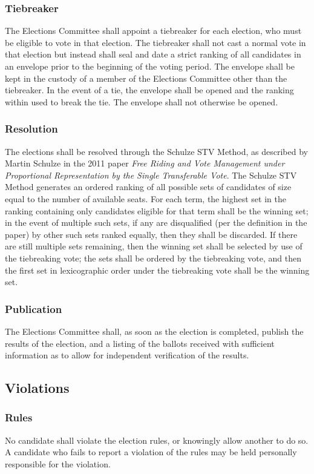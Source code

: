 \subsubsection{Tiebreaker}
The Elections Committee shall appoint a tiebreaker for each election, who must
be eligible to vote in that election. The tiebreaker shall not cast a normal
vote in that election but instead shall seal and date a strict ranking of all
candidates in an envelope prior to the beginning of the voting period. The
envelope shall be kept in the custody of a member of the Elections Committee
other than the tiebreaker. In the event of a tie, the envelope shall be opened
and the ranking within used to break the tie. The envelope shall not otherwise
be opened.

\subsubsection{Resolution}
The elections shall be resolved through the Schulze STV Method, as described by
Martin Schulze in the 2011 paper \emph{Free Riding and Vote Management under
Proportional Representation by the Single Transferable Vote}. The Schulze STV
Method generates an ordered ranking of all possible sets of candidates of size
equal to the number of available seats. For each term, the highest set in the
ranking containing only candidates eligible for that term shall be the winning
set; in the event of multiple such sets, if any are disqualified (per the
definition in the paper) by other such sets ranked equally, then they shall be
discarded. If there are still multiple sets remaining, then the winning set
shall be selected by use of the tiebreaking vote; the sets shall be ordered by
the tiebreaking vote, and then the first set in lexicographic order under the
tiebreaking vote shall be the winning set.

\subsubsection{Publication}
The Elections Committee shall, as soon as the election is completed, publish the
results of the election, and a listing of the ballots received with sufficient
information as to allow for independent verification of the results.

\subsection{Violations}
\subsubsection{Rules}
No candidate shall violate the election rules, or knowingly allow another to do
so. A candidate who fails to report a violation of the rules may be held
personally responsible for the violation.

